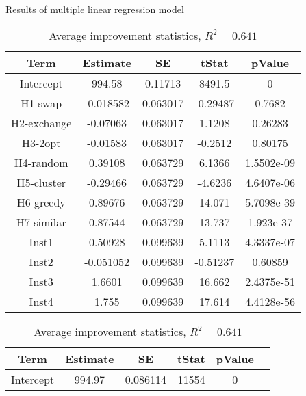 \documentclass[../main.tex]{subfiles}
\begin{document}
\begin{table}
    \centering
    \caption{Results of multiple linear regression model}
    \begin{adjustbox}{width=\columnwidth,center}
        \begin{subtable}{.75\columnwidth}
            \centering
            \begin{tabular}{ccccc}
            \hline
            Term    &Estimate   & SE    & tStat & pValue \\ 
            \hline                
        Intercept   & 994.58    & 0.11713       & 8491.5    & 0         \\
            H1-swap      & -0.018582 & 0.063017      & -0.29487  & 0.7682    \\
            H2-exchange      & -0.07063  & 0.063017      & 1.1208    & 0.26283   \\
            H3-2opt      & -0.01583  & 0.063017      & -0.2512   & 0.80175   \\
            H4-random      & 0.39108   & 0.063729      & 6.1366    & 1.5502e-09\\
            H5-cluster      & -0.29466  & 0.063729      & -4.6236   & 4.6407e-06\\
            H6-greedy      & 0.89676   & 0.063729      & 14.071    & 5.7098e-39\\
            H7-similar      & 0.87544   & 0.063729      & 13.737    & 1.923e-37 \\
            Inst1   & 0.50928   & 0.099639      & 5.1113    & 4.3337e-07\\
            Inst2   & -0.051052 & 0.099639      & -0.51237  & 0.60859   \\
            Inst3   & 1.6601    & 0.099639      & 16.662    & 2.4375e-51\\
            Inst4   & 1.755     &  0.099639     & 17.614    & 4.4128e-56\\
            \hline
            \end{tabular}
        \caption{Average improvement statistics, $R^2=0.641$}
        \label{tab:regrAvrgNormal}
        \end{subtable}
        \hfill
        \begin{subtable}{.75\columnwidth}
            \centering
            \begin{tabular}{cccccc}
            \hline
            Term    &Estimate   & SE    & tStat & pValue \\ 
            \hline                
        Intercept   & 994.97    & 0.086114      & 11554     & 0         \\

\end{tabular}
\end{subtable}
\end{adjustbox}
\end{table}
\end{document}
